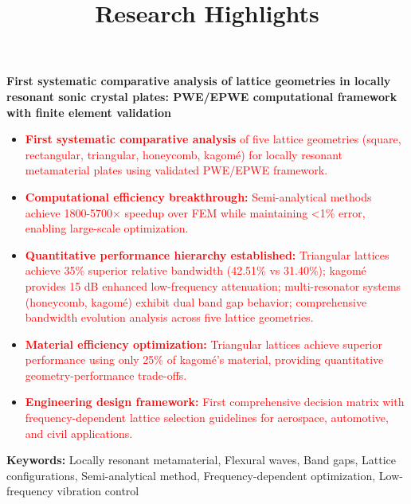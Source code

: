 \documentclass[11pt]{article}
\title{\textbf{Research Highlights}}
\author{}
\date{}
\begin{document}
\maketitle

\vspace{-1cm}

\textbf{First systematic comparative analysis of lattice geometries in locally resonant sonic crystal plates: PWE/EPWE computational framework with finite element validation}

\vspace{0.5cm}

\begin{itemize}[leftmargin=0.5cm, itemsep=0.3cm]

\item \textcolor{red}{\textbf{First systematic comparative analysis} of five lattice geometries (square, rectangular, triangular, honeycomb, kagomé) for locally resonant metamaterial plates using validated PWE/EPWE framework.}

\item \textcolor{red}{\textbf{Computational efficiency breakthrough:} Semi-analytical methods achieve 1800-5700× speedup over FEM while maintaining <1\% error, enabling large-scale optimization.}

\item \textcolor{red}{\textbf{Quantitative performance hierarchy established:} Triangular lattices achieve 35\% superior relative bandwidth (42.51\% vs 31.40\%); kagomé provides 15 dB enhanced low-frequency attenuation; multi-resonator systems (honeycomb, kagomé) exhibit dual band gap behavior; comprehensive bandwidth evolution analysis across five lattice geometries.}

\item \textcolor{red}{\textbf{Material efficiency optimization:} Triangular lattices achieve superior performance using only 25\% of kagomé's material, providing quantitative geometry-performance trade-offs.}

\item \textcolor{red}{\textbf{Engineering design framework:} First comprehensive decision matrix with frequency-dependent lattice selection guidelines for aerospace, automotive, and civil applications.}

\end{itemize}

\vspace{0.5cm}

\textbf{Keywords:} Locally resonant metamaterial, Flexural waves, Band gaps, Lattice configurations, Semi-analytical method, Frequency-dependent optimization, Low-frequency vibration control
\end{document}
